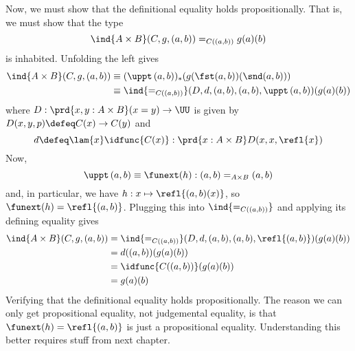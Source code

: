 Now, we must show that the definitional equality holds propositionally.  That
is, we must show that the type
\[
  \ind{A \times B}(C, g, (a, b)) =_{C((a, b))} g(a)(b)
\]
is inhabited.  Unfolding the left gives
\begin{align*}
\ind{A \times B}(C, g, (a, b))
&\equiv
(\uppt\, (a, b))_{*}(g(\fst (a, b))(\snd (a, b)))
\\&\equiv
\ind{=_{C((a, b))}}(D, d, (a, b), (a, b), \uppt\, (a, b))(g(a)(b))
\end{align*}
where $D : \prd{x, y : A \times B} (x = y) \to \UU$ is given by $D(x, y, p)
\defeq C(x) \to C(y)$ and
\[
d \defeq \lam{x}\idfunc{C(x)} : \prd{x:A\times B} D(x, x, \refl{x})
\]
Now,
\[
\uppt\, (a, b) \equiv \funext(h) : (a, b) =_{A \times B} (a, b)
\]
and, in particular, we have $h : x \mapsto \refl{(a, b)(x)}$, so $\funext(h) =
\refl{(a, b)}$.  Plugging this into $\ind{=_{C((a, b))}}$ and applying its
defining equality gives
\begin{align*}
\ind{A \times B}(C, g, (a, b))
&=
\ind{=_{C((a, b))}}(D, d, (a, b), (a, b), \refl{(a, b)})(g(a)(b))
\\&=
d((a, b))(g(a)(b))
\\&=
\idfunc{C((a, b))}(g(a)(b))
\\&=
g(a)(b)
\end{align*}
Verifying that the definitional equality holds propositionally.  The reason we
can only get propositional equality, not judgemental equality, is that
$\funext(h) = \refl{(a, b)}$ is just a propositional equality.  Understanding
this better requires stuff from next chapter. 
